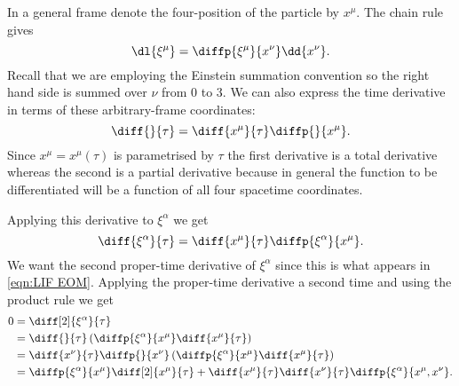 \documentclass[fleqn]{NotesClass}
\begin{document}
    In a general frame denote the four-position of the particle by \(x^\mu\).
    The chain rule gives
    \begin{equation}
        \dl{\xi^\mu} = \diffp{\xi^\mu}{x^\nu} \dd{x^\nu}.
    \end{equation}
    Recall that we are employing the Einstein summation convention so the right hand side is summed over \(\nu\) from 0 to 3.
    We can also express the time derivative in terms of these arbitrary-frame coordinates:
    \begin{equation}
        \diff{}{\tau} = \diff{x^\mu}{\tau} \diffp{}{x^\mu}.
    \end{equation}
    Since \(x^\mu = x^\mu(\tau)\) is parametrised by \(\tau\) the first derivative is a total derivative whereas the second is a partial derivative because in general the function to be differentiated will be a function of all four spacetime coordinates.
    
    Applying this derivative to \(\xi^\alpha\) we get
    \begin{equation}
        \diff{\xi^\alpha}{\tau} = \diff{x^\mu}{\tau}\diffp{\xi^\alpha}{x^\mu}.
    \end{equation}
    We want the second proper-time derivative of \(\xi^\alpha\) since this is what appears in \cref{eqn:LIF EOM}.
    Applying the proper-time derivative a second time and using the product rule we get
    \begin{align}
        0 &= \diff[2]{\xi^\alpha}{\tau}\\
        &= \diff{}{\tau}\left( \diffp{\xi^\alpha}{x^\mu} \diff{x^\mu}{\tau} \right)\\
        &= \diff{x^\nu}{\tau}\diffp{}{x^\nu}\left( \diffp{\xi^\alpha}{x^\mu} \diff{x^\mu}{\tau} \right)\\
        &= \diffp{\xi^\alpha}{x^\mu}\diff[2]{x^\mu}{\tau} + \diff{x^\mu}{\tau} \diff{x^\nu}{\tau} \diffp{\xi^\alpha}{x^\mu, x^\nu}.
    \end{align}
    
\end{document}
